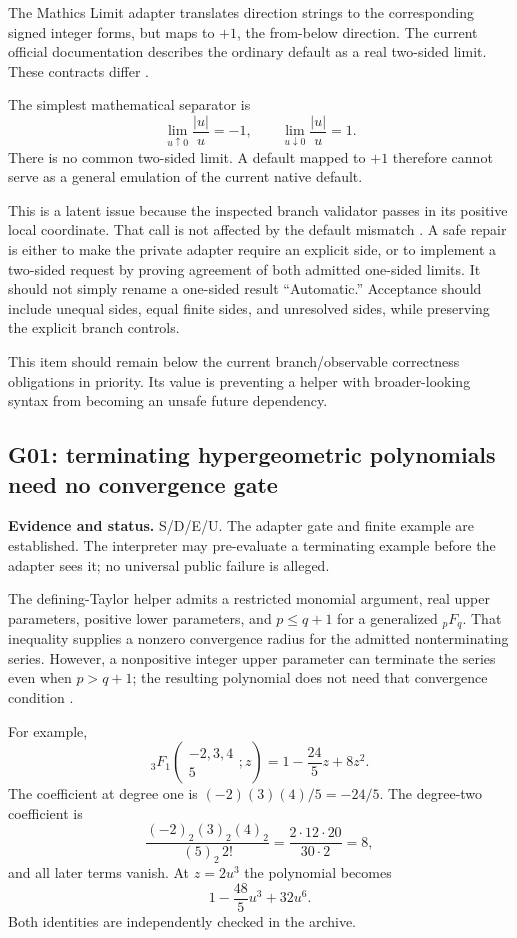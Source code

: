 \documentclass[11pt,a4paper]{article}
\newcommand{\code}[1]{\texttt{\detokenize{#1}}}
\newcommand{\evidence}[1]{\par\noindent\textbf{Evidence and status.} #1\par}
\theoremstyle{remark}
\begin{document}
The Mathics Limit adapter translates direction strings to the corresponding signed integer forms, but maps \code{Automatic} to $+1$, the from-below direction. The current official documentation describes the ordinary default as a real two-sided limit. These contracts differ \cite{mathicssimplification,wllimit}.

The simplest mathematical separator is
\[
 \lim_{u\uparrow0}\frac{|u|}{u}=-1,
 \qquad
 \lim_{u\downarrow0}\frac{|u|}{u}=1.
\]
There is no common two-sided limit. A default mapped to $+1$ therefore cannot serve as a general emulation of the current native default.

This is a latent issue because the inspected branch validator passes \code{Direction -> -1} in its positive local coordinate. That call is not affected by the default mismatch \cite{inversebranches}. A safe repair is either to make the private adapter require an explicit side, or to implement a two-sided request by proving agreement of both admitted one-sided limits. It should not simply rename a one-sided result ``Automatic.'' Acceptance should include unequal sides, equal finite sides, and unresolved sides, while preserving the explicit branch controls.

This item should remain below the current branch/observable correctness obligations in priority. Its value is preventing a helper with broader-looking syntax from becoming an unsafe future dependency.

\subsection{G01: terminating hypergeometric polynomials need no convergence gate}\label{sec:hypergeom}
\evidence{S/D/E/U. The adapter gate and finite example are established. The interpreter may pre-evaluate a terminating example before the adapter sees it; no universal public failure is alleged.}

The defining-Taylor helper admits a restricted monomial argument, real upper parameters, positive lower parameters, and $p\le q+1$ for a generalized ${}_pF_q$. That inequality supplies a nonzero convergence radius for the admitted nonterminating series. However, a nonpositive integer upper parameter can terminate the series even when $p>q+1$; the resulting polynomial does not need that convergence condition \cite{mathicstaylor,dlmf16}.

For example,
\begin{equation}\label{eq:3f1}
 {}_3F_1\!\left(\begin{matrix}-2,3,4\\5\end{matrix};z\right)
 =1-\frac{24}{5}z+8z^2.
\end{equation}
The coefficient at degree one is $(-2)(3)(4)/5=-24/5$. The degree-two coefficient is
\[
 \frac{(-2)_2(3)_2(4)_2}{(5)_2\,2!}
 =\frac{2\cdot12\cdot20}{30\cdot2}=8,
\]
and all later terms vanish. At $z=2u^3$ the polynomial becomes
\[
 1-\frac{48}{5}u^3+32u^6.
\]
Both identities are independently checked in the archive.
\end{document}
